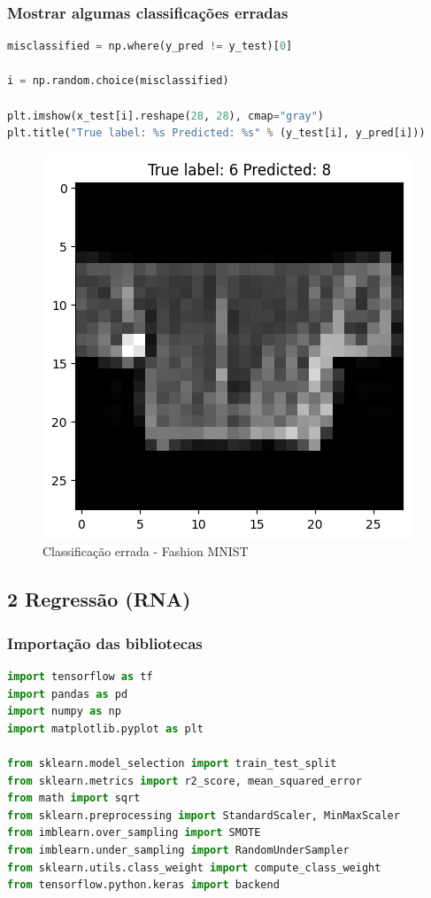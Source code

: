 \subsubsection*{Mostrar algumas classificações erradas}
\begin{lstlisting}[language=Python, style=input]
misclassified = np.where(y_pred != y_test)[0]

i = np.random.choice(misclassified)

plt.imshow(x_test[i].reshape(28, 28), cmap="gray")
plt.title("True label: %s Predicted: %s" % (y_test[i], y_pred[i]))
\end{lstlisting}
\begin{figure}[H]
\centering
\includegraphics[width=.6\linewidth]{apendices/fig/13_IAA012_4.png}
\caption{Classificação errada - Fashion MNIST}
\end{figure}

\subsection*{\textbf{2 Regressão (RNA)}}
\subsubsection*{Importação das bibliotecas}
\begin{lstlisting}[language=Python, style=input]
import tensorflow as tf
import pandas as pd
import numpy as np
import matplotlib.pyplot as plt

from sklearn.model_selection import train_test_split
from sklearn.metrics import r2_score, mean_squared_error
from math import sqrt
from sklearn.preprocessing import StandardScaler, MinMaxScaler
from imblearn.over_sampling import SMOTE
from imblearn.under_sampling import RandomUnderSampler
from sklearn.utils.class_weight import compute_class_weight
from tensorflow.python.keras import backend
\end{lstlisting}
